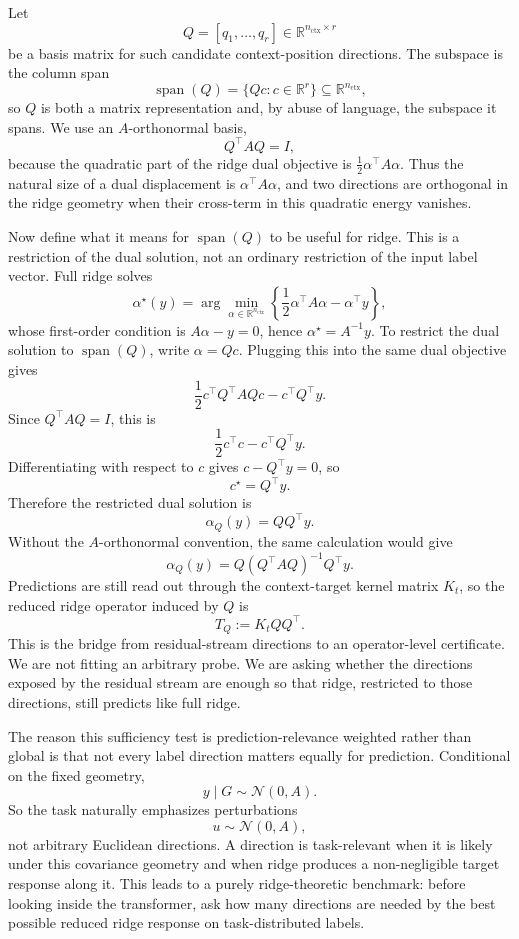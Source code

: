 \documentclass[11pt]{article}
\newcommand{\R}{\mathbb{R}}
\newcommand{\spanop}{\operatorname{span}}
\begin{document}
Let
\[
Q=[q_1,\ldots,q_r]\in\R^{n_{\mathrm{ctx}}\times r}
\]
be a basis matrix for such candidate context-position directions. The subspace is the column span
\[
\spanop(Q)=\{Qc:c\in\R^r\}\subseteq\R^{n_{\mathrm{ctx}}},
\]
so \(Q\) is both a matrix representation and, by abuse of language, the subspace it spans. We use
an \(A\)-orthonormal basis,
\[
Q^\top A Q=I,
\]
because the quadratic part of the ridge dual objective is \(\frac12\alpha^\top A\alpha\). Thus the
natural size of a dual displacement is \(\alpha^\top A\alpha\), and two directions are orthogonal in
the ridge geometry when their cross-term in this quadratic energy vanishes.

Now define what it means for \(\spanop(Q)\) to be useful for ridge. This is a restriction of the
dual solution, not an ordinary restriction of the input label vector. Full ridge solves
\[
\alpha^\star(y)
=
\arg\min_{\alpha\in\R^{n_{\mathrm{ctx}}}}
\left\{
\frac12\alpha^\top A\alpha-\alpha^\top y
\right\},
\]
whose first-order condition is \(A\alpha-y=0\), hence \(\alpha^\star=A^{-1}y\). To restrict the
dual solution to \(\spanop(Q)\), write \(\alpha=Qc\). Plugging this into the same dual objective gives
\[
\frac12 c^\top Q^\top A Qc-c^\top Q^\top y.
\]
Since \(Q^\top A Q=I\), this is
\[
\frac12 c^\top c-c^\top Q^\top y.
\]
Differentiating with respect to \(c\) gives \(c-Q^\top y=0\), so
\[
c^\star=Q^\top y.
\]
Therefore the restricted dual solution is
\[
\alpha_Q(y)=QQ^\top y.
\]
Without the \(A\)-orthonormal convention, the same calculation would give
\[
\alpha_Q(y)=Q(Q^\top A Q)^{-1}Q^\top y.
\]
Predictions are still read out through the context-target kernel matrix \(K_t\), so the reduced
ridge operator induced by \(Q\) is
\[
T_Q:=K_tQQ^\top.
\]
This is the bridge from residual-stream directions to an operator-level certificate. We are not
fitting an arbitrary probe. We are asking whether the directions exposed by the residual stream are
enough so that ridge, restricted to those directions, still predicts like full ridge.

The reason this sufficiency test is prediction-relevance weighted rather than global is that not
every label direction matters equally for prediction. Conditional on the fixed geometry,
\[
y\mid G\sim\mathcal{N}(0,A).
\]
So the task naturally emphasizes perturbations
\[
u\sim\mathcal{N}(0,A),
\]
not arbitrary Euclidean directions. A direction is task-relevant when it is likely under this
covariance geometry and when ridge produces a non-negligible target response along it. This leads
to a purely ridge-theoretic benchmark: before looking inside the transformer, ask how many
directions are needed by the best possible reduced ridge response on task-distributed labels.
\end{document}
